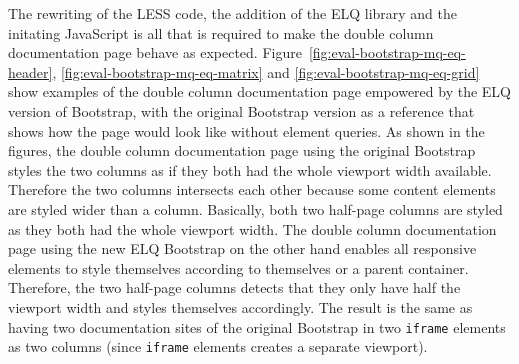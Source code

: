 \documentclass[a4paper,11pt]{kth-mag}
\newcommand{\code}[1]{\texttt{#1}}
\begin{document}
      The rewriting of the LESS code, the addition of the \gls{ELQ} library and the initating JavaScript is all that is required to make the double column documentation page behave as expected.
      Figure~\ref{fig:eval-bootstrap-mq-eq-header}, \ref{fig:eval-bootstrap-mq-eq-matrix} and \ref{fig:eval-bootstrap-mq-eq-grid} show examples of the double column documentation page empowered by the \gls{ELQ} version of Bootstrap, with the original Bootstrap version as a reference that shows how the page would look like without element queries.
      As shown in the figures, the double column documentation page using the original Bootstrap styles the two columns as if they both had the whole viewport width available.
      Therefore the two columns intersects each other because some content elements are styled wider than a column.
      Basically, both two half-page columns are styled as they both had the whole viewport width.
      The double column documentation page using the new \gls{ELQ} Bootstrap on the other hand enables all responsive elements to style themselves according to themselves or a parent container.
      Therefore, the two half-page columns detects that they only have half the viewport width and styles themselves accordingly.
      The result is the same as having two documentation sites of the original Bootstrap in two \code{iframe} elements as two columns (since \code{iframe} elements creates a separate viewport).
\end{document}
